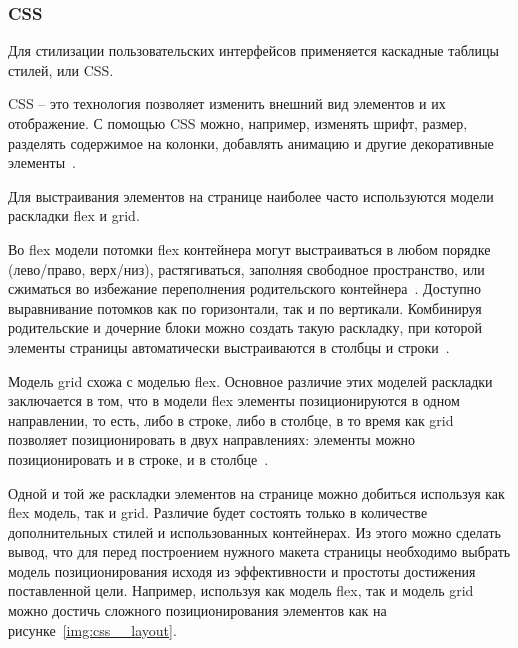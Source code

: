 \subsubsection{CSS}

Для стилизации пользовательских интерфейсов применяется каскадные таблицы стилей, или CSS.

CSS -- это технология позволяет изменить внешний вид элементов и их отображение. С помощью CSS можно, например, изменять шрифт, размер, разделять содержимое на колонки, добавлять анимацию и другие декоративные элементы~\cite{mdn}.

Для выстраивания элементов на странице наиболее часто используются модели раскладки flex и grid.

Во flex модели потомки flex контейнера могут выстраиваться в любом порядке (лево/право, верх/низ), растягиваться, заполняя свободное пространство, или сжиматься во избежание переполнения родительского контейнера~\cite{mdn}. Доступно выравнивание потомков как по горизонтали, так и по вертикали. Комбинируя родительские и дочерние блоки можно создать такую раскладку, при которой элементы страницы автоматически выстраиваются в столбцы и строки~\cite{mdn}.

Модель grid схожа с моделью flex. Основное различие этих моделей раскладки заключается в том, что в модели flex элементы позиционируются в одном направлении, то есть, либо в строке, либо в столбце, в то время как grid позволяет позиционировать в двух направлениях: элементы можно позиционировать и в строке, и в столбце~\cite{mdn}.

Одной и той же раскладки элементов на странице можно добиться используя как flex модель, так и grid. Различие будет состоять только в количестве дополнительных стилей и использованных контейнерах. Из этого можно сделать вывод, что для перед построением нужного макета страницы необходимо выбрать модель позиционирования исходя из эффективности и простоты достижения поставленной цели. Например, используя как модель flex, так и модель grid можно достичь сложного позиционирования элементов как на рисунке~\ref{img:css__layout}.

